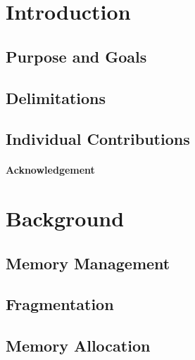 \documentclass[a4paper,12pt]{article}
\begin{document}

\cleardoublepage

\mainmatter


\section{Introduction}
\label{sec:introduction}


\subsection{Purpose and Goals}
\label{sec:purpose}


\subsection{Delimitations}
\label{sec:delimitations}


\subsection{Individual Contributions}
\label{sec:individual_contrubitons}


\paragraph{Acknowledgement}


\section{Background}
\label{sec:backgrond}


\subsection{Memory Management}
\label{sec:memory_management}


\subsection{Fragmentation}
\label{sec:fragmentation}


\subsection{Memory Allocation}
\label{sec:memory_allocation}

\end{document}
